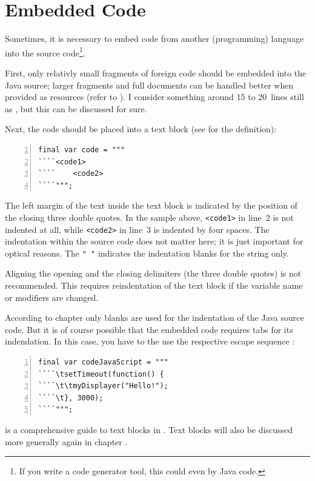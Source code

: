 \section{Embedded Code}\label{sec:EmbeddedCode}
Sometimes, it is necessary to embed code from another (programming) language into the \Java source code\footnote{If you write a code generator tool, this could even by Java code.}.

First, only relativly small fragments of foreign code should be embedded into the Java source; larger fragments and full documents can be handled better when provided as resources (refer to ). I consider something around 15 to 20~lines still as , but this can be discussed for sure.

Next, the code should be placed into a text block (see \autocite{ORACLE_DOC_LANGUAGE_SPECIFICATION:TextBlocks} for the definition):
\begin{lstlisting}[numbers=left]
final var code = """
````<code1>
````    <code2>
````""";
\end{lstlisting}

The left margin of the text inside the text block is indicated by the position of the closing three double quotes. In the sample above, \verb#<code1># in line~2 is not indented at all, while \verb#<code2># in line~3 is indented by four spaces. The indentation within the source code does not matter here; it is just important for optical reasons. The \lstinline|" "| indicates the indentation blanks for the string only.

Aligning the opening and the closing delimiters (the three double quotes) is not recommended. This requires reindentation of the text block if the variable name or modifiers are changed.

According to chapter  only blanks are used for the indentation of the Java source code. But it is of course possible that the embedded code requires tabs for its indendation. In this case, you have to the use the respective escape sequence \bdq{\lstinline|\\t|}:
\begin{lstlisting}[numbers=left]
final var codeJavaScript = """
````\tsetTimeout(function() {
````\t\tmyDisplayer("Hello!");
````\t}, 3000);
````""";
\end{lstlisting}

 \autocite{Laskey:TextBlocks} is a comprehensive guide to text blocks in \Java. Text blocks will also be discussed more generally again in chapter .

